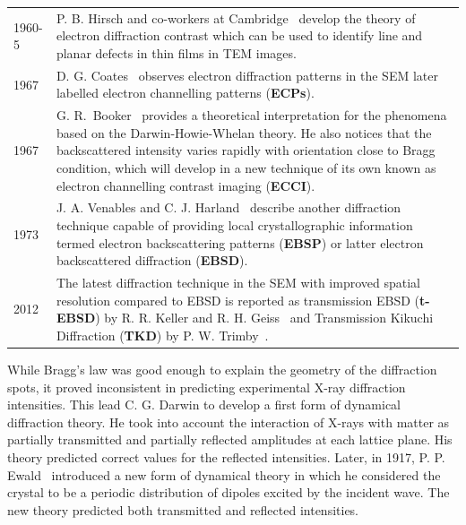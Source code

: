 \begin{table}[htpb]
\begin{tabular}{p{1.2cm}p{11cm}}
  {\small 1960-5} & {\small P. B. Hirsch and co-workers at Cambridge~\cite{Hirsch60, electronMicroscopy} develop the theory of electron diffraction contrast which can be used to identify line and planar defects in thin films in TEM images.}\\
 
  {\small 1967} & {\small D. G. Coates~\cite{Coates67} observes electron diffraction patterns in the SEM later labelled electron channelling patterns (\textbf{ECPs}). }\\
  
  {\small 1967} & {\small  G. R.~Booker~\cite{Booker67} provides a theoretical interpretation for the phenomena based on the Darwin-Howie-Whelan theory. He also notices that the backscattered intensity varies rapidly with orientation close to Bragg condition, which will develop in a new technique of its own known as electron channelling contrast imaging (\textbf{ECCI}).}\\

    {\small 1973} & {\small J. A. Venables and C. J. Harland~\cite{Venables73} describe another diffraction technique capable of providing local crystallographic information termed electron backscattering patterns (\textbf{EBSP}) or latter electron backscattered diffraction (\textbf{EBSD}). }\\
  
   {\small 2012} & {\small The latest diffraction technique in the SEM with improved spatial resolution compared to EBSD is reported as transmission EBSD (\textbf{t-EBSD}) by R. R. Keller and R. H. Geiss~\cite{Keller12} and Transmission Kikuchi Diffraction (\textbf{TKD}) by P. W. Trimby~\cite{Trimby12}. }\\
\bottomrule
\end{tabular}
\end{table}
\renewcommand{\arraystretch}{1.}
While Bragg's law was good enough to explain the geometry of the diffraction spots, it proved inconsistent in predicting experimental X-ray diffraction intensities. This lead C. G. Darwin to develop a first form of dynamical diffraction theory. He took into account the interaction of X-rays with matter as partially transmitted and partially reflected amplitudes at each lattice plane. His theory predicted correct values for the reflected intensities. Later, in 1917, P. P. Ewald~\cite{Ewald17} introduced a new form of dynamical theory in which he considered the crystal to be a periodic distribution of dipoles excited by the incident wave. The new theory predicted both transmitted and reflected intensities. 

